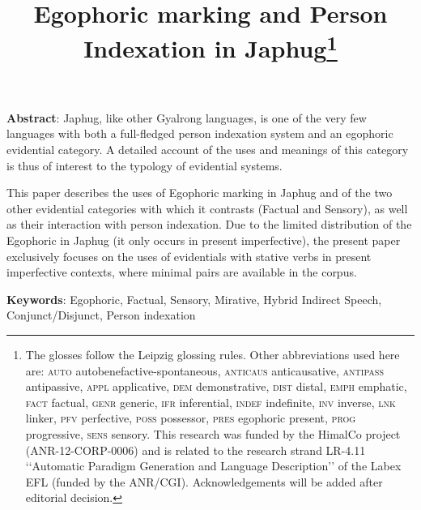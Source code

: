\documentclass[11pt]{article}
\begin{document}
 
\title{Egophoric marking and Person Indexation in Japhug\footnote{ The glosses follow the Leipzig glossing rules. Other abbreviations used here are: \textsc{auto}  autobenefactive-spontaneous, \textsc{anticaus} anticausative, \textsc{antipass} antipassive, \textsc{appl} applicative, \textsc{dem} demonstrative,  \textsc{dist} distal, \textsc{emph} emphatic, \textsc{fact} factual, \textsc{genr} generic, \textsc{ifr} inferential, \textsc{indef} indefinite, \textsc{inv} inverse,  \textsc{lnk} linker, \textsc{pfv} perfective, \textsc{poss} possessor, \textsc{pres} egophoric present, \textsc{prog} progressive, \textsc{sens} sensory. This research was funded by the HimalCo project (ANR-12-CORP-0006) and is related to the research strand LR-4.11 ‘‘Automatic Paradigm Generation and Language Description’’ of the Labex EFL (funded by the ANR/CGI). Acknowledgements will be added after editorial decision. %
} }
\maketitle

\textbf{Abstract}: Japhug, like other Gyalrong languages, is one of the very few languages with both a full-fledged person indexation system and an egophoric evidential category. A detailed account of the uses and meanings of this category is thus of interest to the typology of evidential systems.

This paper describes the uses of Egophoric marking in Japhug and of the two other evidential categories with which it contrasts (Factual and Sensory), as well as their interaction with person indexation. Due to the limited distribution of the Egophoric in Japhug (it only occurs in present imperfective), the present paper exclusively focuses on the uses of evidentials with stative verbs in present imperfective contexts, where minimal pairs are available in the corpus.

\textbf{Keywords}: Egophoric, Factual, Sensory, Mirative, Hybrid Indirect Speech, Conjunct/Disjunct, Person indexation

\sloppy
\end{document}
